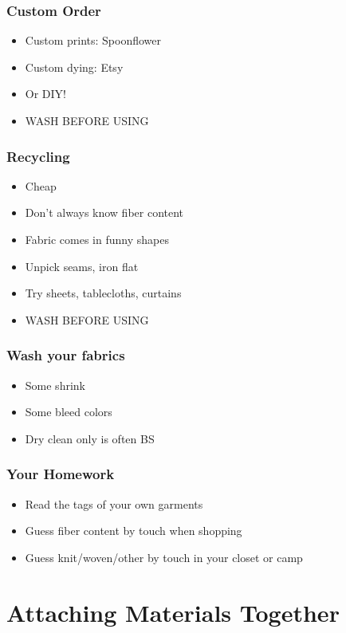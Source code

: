 \documentclass{beamer}
\begin{document}
\begin{frame}[fragile]
\frametitle{Custom Order}
\begin{itemize}
\item Custom prints: Spoonflower
\item Custom dying: Etsy
\item Or DIY!
\item WASH BEFORE USING
\end{itemize}
\end{frame}

\begin{frame}[fragile]
\frametitle{Recycling}
\begin{itemize}
\item Cheap
\item Don't always know fiber content
\item Fabric comes in funny shapes
\item Unpick seams, iron flat
\item Try sheets, tablecloths, curtains
\item WASH BEFORE USING
\end{itemize}
\end{frame}

\begin{frame}[fragile]
\frametitle{Wash your fabrics}
\begin{itemize}
\item Some shrink
\item Some bleed colors
\item Dry clean only is often BS
\end{itemize}
\end{frame}


\begin{frame}[fragile]
\frametitle{Your Homework}
\begin{itemize}
\item Read the tags of your own garments
\item Guess fiber content by touch when shopping
\item Guess knit/woven/other by touch in your closet or camp
\end{itemize}
\end{frame}

\section{Attaching Materials Together}

\begin{frame}[fragile]
\tableofcontents[currentsection]
\end{frame}
\end{document}
